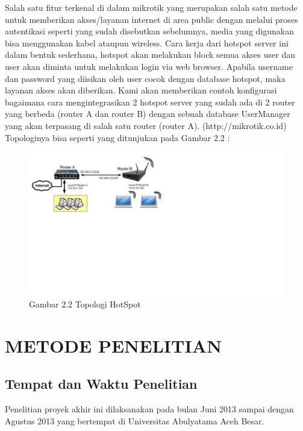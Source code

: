 \documentclass{jtetiproposalskripsi}
\begin{document}
Salah satu fitur terkenal di dalam mikrotik yang merupakan salah satu metode untuk memberikan akses/layanan internet di area public dengan melalui proses autentikasi seperti yang sudah disebutkan sebelumnya, media yang digunakan bisa menggunakan kabel ataupun wireless. Cara kerja dari hotspot server ini dalam bentuk sederhana, hotspot akan melakukan block semua akses user dan user akan diminta untuk melakukan login via web browser. Apabila username dan password yang diisikan oleh user cocok dengan database hotspot, maka layanan akses akan diberikan. Kami akan memberikan contoh konfigurasi bagaimana cara mengintegrasikan 2 hotspot server yang sudah ada di 2 router yang berbeda (router A dan router B) dengan sebuah database UserManager yang akan terpasang di salah satu router (router A). (http://mikrotik.co.id) Topologinya bisa seperti yang ditunjukan pada Gambar 2.2 :

\vspace{-0.5cm}
\begin{figure}[ht!]
  \centering
    \includegraphics[width=13cm]{gambar/topologihotspot}
\caption{Gambar 2.2 Topologi HotSpot}
\end{figure}

\chapter{METODE PENELITIAN}
\section{Tempat dan Waktu Penelitian}
Penelitian proyek akhir ini dilaksanakan pada bulan Juni 2013 sampai dengan Agustus 2013 yang bertempat di Universitas Abulyatama Aceh Besar.
\end{document}
